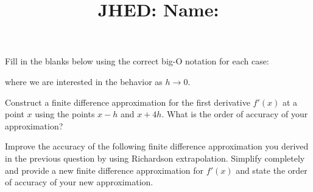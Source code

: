 \documentclass[reqno]{exam}
\title{\normalsize{
  JHED: \underline{\hspace{4cm}} \hspace{1em} Name: \underline{\hspace{9cm}}}
   }
\author{}
\date{}
\begin{document}
\maketitle
\vspace{-2cm} %

\begin{questions}
    \question[4] 
  Fill in the blanks below using the correct big-O notation for each case:\vspace{1.5ex}
  where we are interested in the behavior as $h \to 0$.

  \question[8]
  Construct a finite difference approximation for the first derivative $f'(x)$ at a point $x$ using the points $x - h$ and $x + 4h$. What is the order of accuracy of your approximation?

  \newpage

  \question[8]
  Improve the accuracy of the following finite difference approximation you derived in the previous question by using Richardson extrapolation. Simplify completely and provide a new finite difference approximation for $f'(x)$ and state the order of accuracy of your new approximation.


\end{questions}
\end{document}
